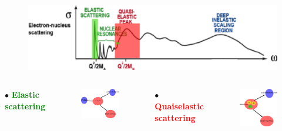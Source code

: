 \documentclass[12pt]{beamer}
\begin{document}
\begin{frame}

\begin{figure}[]
	\centering
	\includegraphics[width=12cm]{../images/Thesis/E_nucleus_spect_QE.png}
\end{figure}
\vspace*{-0.5cm}
\begin{columns}[t] %
	$\bullet$ \textbf{\textcolor{green}{Elastic scattering}}\\
	\begin{figure}[]
		\includegraphics[width=3.5cm]{../images/elast_draw.png}
	\end{figure}
	$\bullet$ \textbf{\textcolor{red}{Quaiselastic scattering}}\\
	\vspace{-20pt}
	\begin{figure}[]
		\includegraphics[width=3.5cm]{../images/quais_draw.png}
	\end{figure}

		
\end{columns}
\end{frame}

\end{document}
